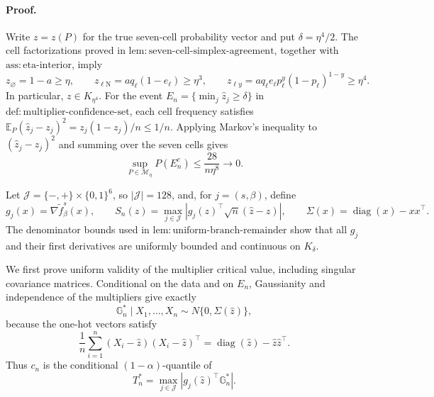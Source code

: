\paragraph{Proof.}
Write \(z=z(P)\) for the true seven-cell probability vector and put \(\delta=\eta^4/2\).  The cell factorizations proved in \(\mathrm{lem{:}seven\text{-}cell\text{-}simplex\text{-}agreement}\), together with \(\mathrm{ass{:}eta\text{-}interior}\), imply
\[
 z_\varnothing=1-a\geq\eta,
 \qquad
 z_{\ell\mathrm N}=a q_\ell(1-e_\ell)\geq\eta^3,
 \qquad
 z_{\ell y}=a q_\ell e_\ell p_\ell^y(1-p_\ell)^{1-y}\geq\eta^4.
\]
In particular, \(z\in K_{\eta^4}\).  For the event \(E_n=\{\min_j\widehat z_j\geq\delta\}\) in \(\mathrm{def{:}multiplier\text{-}confidence\text{-}set}\), each cell frequency satisfies \(\mathbb E_P(\widehat z_j-z_j)^2=z_j(1-z_j)/n\leq1/n\).  Applying Markov's inequality to \((\widehat z_j-z_j)^2\) and summing over the seven cells gives
\[
\sup_{P\in\mathcal M_\eta}P(E_n^c)
\leq\frac{28}{n\eta^8}\longrightarrow0.
\]

Let \(\mathcal J=\{-,+\}\times\{0,1\}^6\), so \(|\mathcal J|=128\), and, for \(j=(s,\beta)\), define
\[
 g_j(x)=\nabla\widetilde f_\beta^s(x),
 \qquad
 S_n(z)=\max_{j\in\mathcal J}
 \left|g_j(z)^\top\sqrt n(\widehat z-z)\right|,
 \qquad
 \Sigma(x)=\operatorname{diag}(x)-xx^\top.
\]
The denominator bounds used in \(\mathrm{lem{:}uniform\text{-}branch\text{-}remainder}\) show that all \(g_j\) and their first derivatives are uniformly bounded and continuous on \(K_\delta\).

We first prove uniform validity of the multiplier critical value, including singular covariance matrices.  Conditional on the data and on \(E_n\), Gaussianity and independence of the multipliers give exactly
\[
 \mathbb G_n^*\mid X_1,\ldots,X_n
 \sim N\{0,\Sigma(\widehat z)\},
\]
because the one-hot vectors satisfy
\[
 \frac1n\sum_{i=1}^n(X_i-\widehat z)(X_i-\widehat z)^\top
 =\operatorname{diag}(\widehat z)-\widehat z\widehat z^\top.
\]
Thus \(c_n\) is the conditional \((1-\alpha)\)-quantile of
\[
 T_n^*=\max_{j\in\mathcal J}
 \left|g_j(\widehat z)^\top\mathbb G_n^*\right|.
\]

